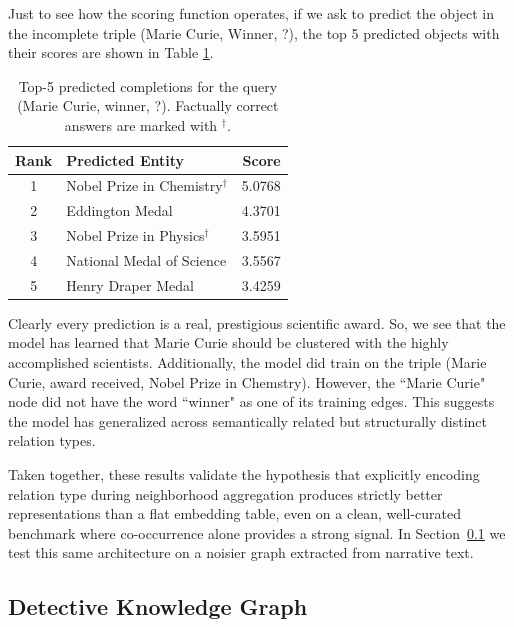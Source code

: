 \documentclass[11pt]{article}
\theoremstyle{definition}
\begin{document}
Just to see how the scoring function operates, if we ask to predict the object in the incomplete triple (Marie Curie, Winner, ?), the top 5 predicted objects with their scores are shown in Table \ref{tab:curie}. 

\begin{table}[H]
\centering
\begin{tabular}{clr}
\toprule
Rank & Predicted Entity & Score \\
\midrule
1  & Nobel Prize in Chemistry$^\dagger$ & 5.0768 \\
2  & Eddington Medal                    & 4.3701 \\
3  & Nobel Prize in Physics$^\dagger$   & 3.5951 \\
4  & National Medal of Science          & 3.5567 \\
5  & Henry Draper Medal                 & 3.4259 \\
\bottomrule
\end{tabular}
\caption{Top-5 predicted completions for the query
         (Marie Curie, winner, ?). 
         Factually correct answers are marked with $^\dagger$.}
\label{tab:curie}
\end{table} 

Clearly every prediction is a real, prestigious scientific award. So, we see that the model has learned that Marie Curie should be clustered with the highly accomplished scientists. Additionally, the model did train on the triple (Marie Curie, award received, Nobel Prize in Chemstry). However, the ``Marie Curie" node did not have the word ``winner" as one of its training edges. This suggests the model has generalized across semantically related but structurally distinct relation types. 

Taken together, these results validate the hypothesis that
explicitly encoding relation type during neighborhood aggregation
produces strictly better representations than a flat embedding
table, even on a clean, well-curated benchmark where co-occurrence
alone provides a strong signal.  In Section~\ref{subsec:detective}
we test this same architecture on a noisier graph extracted from
narrative text.

\subsection{Detective Knowledge Graph}
\label{subsec:detective}
\end{document}
